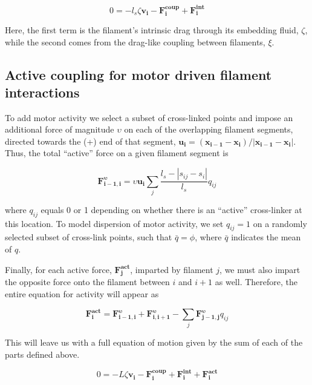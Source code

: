 \documentclass[10pt,letterpaper]{article}
\begin{document}
\begin{equation}
\label{eqn:syst1}
0 = -l_s\zeta\mathbf{ v_i} -\mathbf{F^{coup}_i}+ \mathbf{F^{int}_i}
\end{equation}

Here, the first term is the filament's intrinsic drag through its embedding fluid, $\zeta$, while the second comes from the drag-like coupling between filaments, $\xi$.  

\subsection*{Active coupling for motor driven filament interactions}

To add motor activity we select a subset of cross-linked points and impose an additional force of magnitude $\upsilon$ on each of the overlapping filament segments, directed towards the (+) end of that segment, $\mathbf{u_i}=(\mathbf{x_{i-1}}-\mathbf{x_{i}})/|\mathbf{x_{i-1}}-\mathbf{x_{i}}|$. Thus, the total ``active'' force on a given filament segment is

\begin{equation}
\label{eqn:moto}
\mathbf{F^{\upsilon}_{i-1,i}}=\upsilon \mathbf{u_i}\sum_j \frac{l_s-|s_{ij}-s_i|}{l_s}q_{ij}
\end{equation}

where $q_{ij}$ equals 0 or 1 depending on whether there is an ``active'' cross-linker at this location. To model dispersion of motor activity, we  set $q_{ij}=1$  on a randomly selected subset of cross-link points, such that $\bar{q}=\phi$, where $\bar{q}$ indicates the mean of $q$.



Finally, for each active force, $\mathbf{F^{act}_j}$, imparted by filament $j$, we must also impart the opposite force onto the filament between $i$ and $i+1$ as well.  Therefore, the entire equation for activity will appear as

\begin{equation}
\label{eqn:active}
\mathbf{F^{act}_{i}}=\mathbf{F^{\upsilon}_{i-1,i}} + \mathbf{F^{\upsilon}_{i,i+1}}
- \sum_{j}\mathbf{F^{\upsilon}_{j-1,j}}q_{ij}
\end{equation}


This will leave us with a full equation of motion given by the sum of each of the parts defined above.

\begin{equation}
\label{eqn:syst3}
0=-L\zeta\mathbf{ v_i} -\mathbf{F^{coup}_i}+ \mathbf{F^{int}_i}+\mathbf{F^{act}_i} 
\end{equation}
\end{document}
